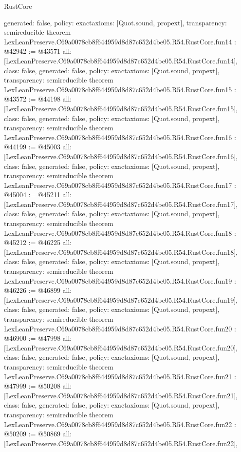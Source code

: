 \begin{lexlean}{RustCore}
\begin{coremodule}
{  generated: false,
  policy: exact{axioms: [Quot.sound, propext]},
  transparency: semireducible
}
theorem LexLeanPreserve.C69a0078cb8f644959d8d87c652d4be05.R54.RustCore.fun14 : @42942 := @43571 {
  all: [LexLeanPreserve.C69a0078cb8f644959d8d87c652d4be05.R54.RustCore.fun14],
  class: false,
  generated: false,
  policy: exact{axioms: [Quot.sound, propext]},
  transparency: semireducible
}
theorem LexLeanPreserve.C69a0078cb8f644959d8d87c652d4be05.R54.RustCore.fun15 : @43572 := @44198 {
  all: [LexLeanPreserve.C69a0078cb8f644959d8d87c652d4be05.R54.RustCore.fun15],
  class: false,
  generated: false,
  policy: exact{axioms: [Quot.sound, propext]},
  transparency: semireducible
}
theorem LexLeanPreserve.C69a0078cb8f644959d8d87c652d4be05.R54.RustCore.fun16 : @44199 := @45003 {
  all: [LexLeanPreserve.C69a0078cb8f644959d8d87c652d4be05.R54.RustCore.fun16],
  class: false,
  generated: false,
  policy: exact{axioms: [Quot.sound, propext]},
  transparency: semireducible
}
theorem LexLeanPreserve.C69a0078cb8f644959d8d87c652d4be05.R54.RustCore.fun17 : @45004 := @45211 {
  all: [LexLeanPreserve.C69a0078cb8f644959d8d87c652d4be05.R54.RustCore.fun17],
  class: false,
  generated: false,
  policy: exact{axioms: [Quot.sound, propext]},
  transparency: semireducible
}
theorem LexLeanPreserve.C69a0078cb8f644959d8d87c652d4be05.R54.RustCore.fun18 : @45212 := @46225 {
  all: [LexLeanPreserve.C69a0078cb8f644959d8d87c652d4be05.R54.RustCore.fun18],
  class: false,
  generated: false,
  policy: exact{axioms: [Quot.sound, propext]},
  transparency: semireducible
}
theorem LexLeanPreserve.C69a0078cb8f644959d8d87c652d4be05.R54.RustCore.fun19 : @46226 := @46899 {
  all: [LexLeanPreserve.C69a0078cb8f644959d8d87c652d4be05.R54.RustCore.fun19],
  class: false,
  generated: false,
  policy: exact{axioms: [Quot.sound, propext]},
  transparency: semireducible
}
theorem LexLeanPreserve.C69a0078cb8f644959d8d87c652d4be05.R54.RustCore.fun20 : @46900 := @47998 {
  all: [LexLeanPreserve.C69a0078cb8f644959d8d87c652d4be05.R54.RustCore.fun20],
  class: false,
  generated: false,
  policy: exact{axioms: [Quot.sound, propext]},
  transparency: semireducible
}
theorem LexLeanPreserve.C69a0078cb8f644959d8d87c652d4be05.R54.RustCore.fun21 : @47999 := @50208 {
  all: [LexLeanPreserve.C69a0078cb8f644959d8d87c652d4be05.R54.RustCore.fun21],
  class: false,
  generated: false,
  policy: exact{axioms: [Quot.sound, propext]},
  transparency: semireducible
}
theorem LexLeanPreserve.C69a0078cb8f644959d8d87c652d4be05.R54.RustCore.fun22 : @50209 := @50869 {
  all: [LexLeanPreserve.C69a0078cb8f644959d8d87c652d4be05.R54.RustCore.fun22],
}
\end{coremodule}
\end{lexlean}
